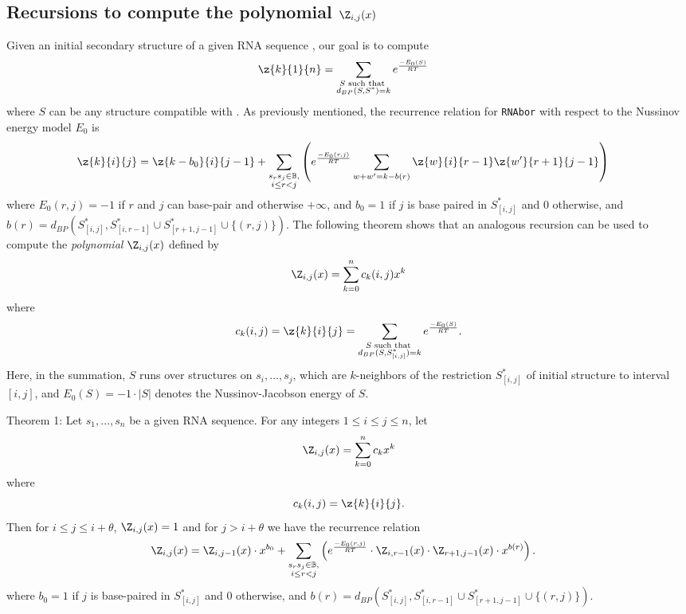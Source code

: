 \subsection*{Recursions to compute the polynomial $\Z_{i,j}(x)$}
\label{section:recursionsForPolynomialZij}

Given an initial secondary structure \strSt of a
given RNA sequence \seq, our goal is to compute
\begin{align}
\label{eq:defZk}
\z{k}{1}{n} &= \sum_{\substack{S \text{ such that }\\ d_{BP}(S,S^*)=k}}
e^{\frac{-E_0(S)}{RT}}
\end{align}
where $S$ can be any structure compatible with \seq.
As previously mentioned, the recurrence relation for {\tt RNAbor}
with respect to the Nussinov energy model $E_0$ is
\begin{align}
\label{eq:RNAborNussRecursion}
\z{k}{i}{j} &= \z{k-b_0}{i}{j-1} + \sum_{\substack{s_r s_j \in \mathbb{B},\\i\le r<j}}\left(e^{\frac{-E_0(r,j)}{RT}}\sum_{w+w'=k-b(r)}
\z{w}{i}{r-1}  \z{w'}{r+1}{j-1} \right)
\end{align}
where $E_0(r,j)=-1$ if $r$ and $j$ can base-pair and otherwise
$+\infty$, and
$b_0 = 1$ if $j$ is base paired in $S^*_{[i,j]}$ and $0$ otherwise, and
$b(r)=d_{BP}(S^*_{[i,j]}, S^*_{[i,r-1]} \cup S^*_{[r+1,j-1]} \cup\{(r,j)\})$.
The following theorem shows that an analogous recursion can be used to compute
the {\em polynomial} $\Z_{i,j}(x)$ defined by
\begin{eqnarray}
\label{eq:defZijpolynomial}
\Z_{i,j}(x) = \sum_{k=0}^n c_k(i,j) x^k
\end{eqnarray}
where
\[ c_k(i,j)= \z{k}{i}{j} =
\sum_{\substack{S \text{ such that }\\ d_{BP}(S,S^*_{[i,j]})=k}}
e^{\frac{-E_0(S)}{RT}}.
\]
Here, in the summation, $S$ runs over structures on $s_i,\ldots,s_j$, which
are $k$-neighbors of the restriction $S^*_{[i,j]}$ of initial structure
\strSt to interval $[i,j]$, and
$E_0(S)=-1 \cdot |S|$ denotes the Nussinov-Jacobson energy of $S$.
\medskip

\noindent
{\sc Theorem 1:} Let $s_1,\ldots,s_n$ be a given RNA sequence.
For any integers $1 \leq i \leq j \leq n$, let
\begin{eqnarray*}
\Z_{i,j}(x) = \sum_{k=0}^n c_k x^k
\end{eqnarray*}
where
\[ c_k(i,j)= \z{k}{i}{j}.
\]
Then  for $i\leq j \leq i+\theta$, $\Z_{i,j}(x)=1$ and for
$j>i+\theta$ we have the recurrence relation
\begin{eqnarray}
\label{eq:polynomialRecursionNussJac}
\Z_{i,j}(x) &= \Z_{i,j-1}(x) \cdot x^{b_0} +
\sum_{\substack{s_r s_j \in \mathbb{B},\\i\le r<j}}
\left(e^{\frac{-E_0(r,j)}{RT}}\cdot
\Z_{i,r-1}(x)\cdot\Z_{r+1,j-1}(x)\cdot x^{b(r)} \right).
\end{eqnarray}
\medskip
where $b_0 = 1$ if $j$ is base-paired in $S^*_{[i,j]}$ and $0$ otherwise, and
$b(r)=d_{BP}(S^*_{[i,j]}, S^*_{[i,r-1]} \cup S^*_{[r+1,j-1]} \cup\{(r,j)\})$.

